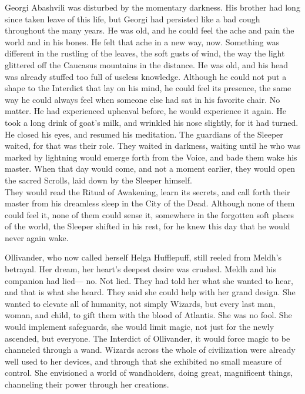 Georgi Abashvili was disturbed by the momentary darkness. His brother had long since taken leave of this life, but Georgi had persisted like a bad cough throughout the many years. He was old, and he could feel the ache and pain the world and in his bones. He felt that ache in a new way, now. Something was different in the rustling of the leaves, the soft gusts of wind, the way the light glittered off the Caucasus mountains in the distance. He was old, and his head was already stuffed too full of useless knowledge. Although he could not put a shape to the Interdict that lay on his mind, he could feel its presence, the same way he could always feel when someone else had sat in his favorite chair.
\SomeVSpace
No matter. He had experienced upheaval before, he would experience it again. He took a long drink of goat’s milk, and wrinkled his nose slightly, for it had turned. He closed his eyes, and resumed his meditation.
\simpleline
{}
The guardians of the Sleeper waited, for that was their role. They waited in darkness, waiting until he who was marked by lightning would emerge forth from the Voice, and bade them wake his master. When that day would come, and not a moment earlier, they would open the sacred Scrolls, laid down by the Sleeper himself.\\They would read the Ritual of Awakening, learn its secrets, and call forth their master from his dreamless sleep in the City of the Dead.
\SomeVSpace
Although none of them could feel it, none of them could sense it, somewhere in the forgotten soft places of the world, the Sleeper shifted in his rest, for he knew this day that he would never again wake.
\simpleline
{}

Ollivander, who now called herself Helga Hufflepuff, still reeled from Meldh’s betrayal. Her dream, her heart’s deepest desire was crushed. Meldh and his companion had lied\mbox{---} no. Not lied. They had told her what she wanted to hear, and that is what she heard. They said she could help with her grand design.
\SmallVSpace
She wanted to elevate all of humanity, not simply Wizards, but every last man, woman, and child, to gift them with the blood of Atlantis. She was no fool. She would implement safeguards, she would limit magic, not just for the newly ascended, but everyone. The Interdict of Ollivander, it would force magic to be channeled through a wand. Wizards across the whole of civilization were already well used to her devices, and through that she exhibited no small measure of control. She envisioned a world of wandholders, doing great, magnificent things, channeling their power through her creations.
\pagebreak

